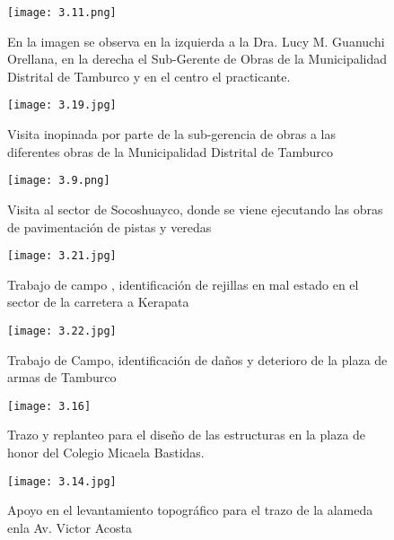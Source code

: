 \begin{figure}[h]
	\captionsetup{width=0.8\textwidth}
	\centering
	\texttt{[image: 3.11.png]}
	\caption[Visita de la asesora de prácticas]{En la imagen se observa en la izquierda a la Dra. Lucy M. Guanuchi Orellana, en la derecha el Sub-Gerente de Obras de la Municipalidad Distrital de Tamburco y en el centro el practicante.}
	\label{fig:visita-de-la-asesora-2}
\end{figure}

\begin{figure}[h]
	\captionsetup{width=0.8\textwidth}
	\centering
	\texttt{[image: 3.19.jpg]}
	\caption[Visita inopinada a las diferentes obras ejecutadas por la Municipalidad Distrital de Tamburco]{Visita inopinada por parte de la sub-gerencia de obras a las diferentes obras de la Municipalidad Distrital de Tamburco}
	\label{fig:1}
\end{figure}

\begin{figure}[h]
	\captionsetup{width=0.8\textwidth}
	\centering
	\texttt{[image: 3.9.png]}
	\caption[Visita a obras en ejecución]{Visita al sector de Socoshuayco, donde se viene ejecutando las obras de pavimentación de pistas y veredas}
	\label{fig:visita-a-campo}
\end{figure}

\begin{figure}[h]
	\captionsetup{width=0.8\textwidth}
	\centering
	\begin{adjustbox}{angle=90}
	\texttt{[image: 3.21.jpg]}
	\end{adjustbox}
	\caption[Trabajo de campo: Identificación de rejillas en mal estado]{Trabajo de campo , identificación de rejillas en mal estado en el sector de la carretera a Kerapata}
	\label{fig:img20230706125859989}
\end{figure}

\begin{figure}[h]
	\captionsetup{width=0.8\textwidth}
	\centering
	\texttt{[image: 3.22.jpg]}
	\caption[Trabajo de campo: Cuantificación de daños y deterioro de la plaza de armas de Tamburco]{Trabajo de Campo, identificación de daños y deterioro de la plaza de armas de Tamburco}
	\label{fig:img20230414120419340}
\end{figure}

\begin{figure}[h]
	\captionsetup{width=0.8\textwidth}
	\centering
	\texttt{[image: 3.16]}
	\caption[Trabajo de Campo: Trazo y replanteo de las estructuras del colegio Micaela Bastidas]{Trazo y replanteo para el diseño de las estructuras en la plaza de honor del Colegio Micaela Bastidas.}
	\label{fig:asset-1}
\end{figure}

\begin{figure}[h]
	\captionsetup{width=0.8\linewidth}
	\centering
	\texttt{[image: 3.14.jpg]}
	\caption[Trabajo de campo: Apoyo en el levantamiento topográfico]{Apoyo en el levantamiento topográfico para el trazo de la alameda enla Av. Victor Acosta}
	\label{fig:img20230327093502248}
\end{figure}
